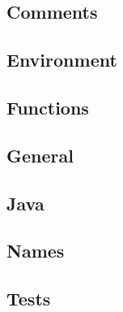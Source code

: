 \documentclass[a4paper, twocolumn]{article}
\begin{document}
\subsection{Comments}

\subsection{Environment}

\subsection{Functions}

\subsection{General}

\subsection{Java}

\subsection{Names}

\subsection{Tests}
\end{document}
